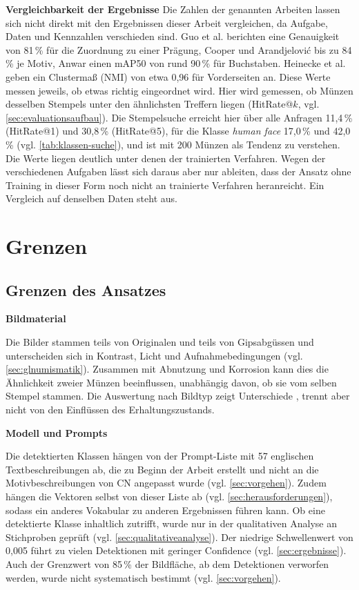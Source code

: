 \vspace{\baselineskip}

\noindent \textbf{Vergleichbarkeit der Ergebnisse} 
\noindent Die Zahlen der genannten Arbeiten lassen sich nicht direkt mit den Ergebnissen dieser Arbeit vergleichen, da Aufgabe, Daten und Kennzahlen verschieden sind. Guo et al. berichten eine Genauigkeit von 81\,\% für die Zuordnung zu einer Prägung, Cooper und Arandjelović bis zu 84\,\% je Motiv, Anwar einen mAP50 von rund 90\,\% für Buchstaben. Heinecke et al. geben ein Clustermaß (NMI) von etwa 0,96 für Vorderseiten an. Diese Werte messen jeweils, ob etwas richtig eingeordnet wird. Hier wird gemessen, ob Münzen desselben Stempels unter den ähnlichsten Treffern liegen (HitRate@$k$, vgl. \cref{sec:evaluationsaufbau}). Die Stempelsuche erreicht hier über alle Anfragen 11,4\,\% (HitRate@1) und 30,8\,\% (HitRate@5), für die Klasse \textit{human face} 17,0\,\% und 42,0\,\% (vgl. \cref{tab:klassen-suche}), und ist mit 200 Münzen als Tendenz zu verstehen. Die Werte liegen deutlich unter denen der trainierten Verfahren. Wegen der verschiedenen Aufgaben lässt sich daraus aber nur ableiten, dass der Ansatz ohne Training in dieser Form noch nicht an trainierte Verfahren heranreicht. Ein Vergleich auf denselben Daten steht aus.

\section{Grenzen}
\label{sec:grenzen}
\subsection{Grenzen des Ansatzes}
\label{sec:grenzen-ansatz}
\textbf{Bildmaterial} 

\noindent Die Bilder stammen teils von Originalen und teils von Gipsabgüssen und unterscheiden sich in Kontrast, Licht und Aufnahmebedingungen (vgl. \cref{sec:glnumismatik}). Zusammen mit Abnutzung und Korrosion kann dies die Ähnlichkeit zweier Münzen beeinflussen, unabhängig davon, ob sie vom selben Stempel stammen. Die Auswertung nach Bildtyp zeigt Unterschiede , trennt aber nicht von den Einflüssen des Erhaltungszustands.

\vspace{\baselineskip}

\noindent \textbf{Modell und Prompts} 

\noindent Die detektierten Klassen hängen von der Prompt-Liste mit 57 englischen Textbeschreibungen ab, die zu Beginn der Arbeit erstellt und nicht an die Motivbeschreibungen von CN angepasst wurde (vgl. \cref{sec:vorgehen}). Zudem hängen die Vektoren selbst von dieser Liste ab (vgl. \cref{sec:herausforderungen}), sodass ein anderes Vokabular zu anderen Ergebnissen führen kann. Ob eine detektierte Klasse inhaltlich zutrifft, wurde nur in der qualitativen Analyse an Stichproben geprüft (vgl. \cref{sec:qualitativeanalyse}). Der niedrige Schwellenwert von 0,005 führt zu vielen Detektionen mit geringer Confidence (vgl. \cref{sec:ergebnisse}). Auch der Grenzwert von 85\,\% der Bildfläche, ab dem Detektionen verworfen werden, wurde nicht systematisch bestimmt (vgl. \cref{sec:vorgehen}). 

